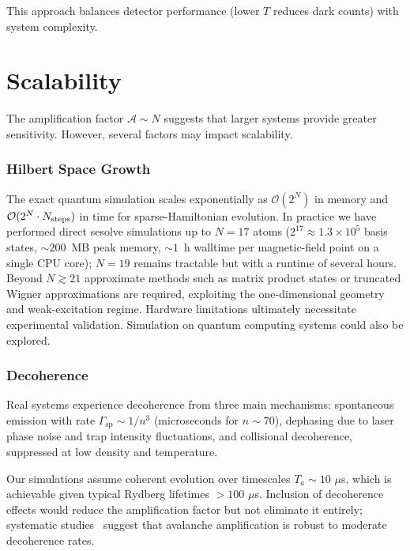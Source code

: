This approach balances detector performance (lower $T$ reduces dark counts) with system complexity.

\section{Scalability}
\label{sec:scalability_atoms}

The amplification factor $\mathcal{A} \sim N$ suggests that larger systems provide greater sensitivity. However, several factors may impact scalability.

\subsubsection{Hilbert Space Growth}

The exact quantum simulation scales exponentially as $\mathcal{O}(2^N)$ in memory and $\mathcal{O}(2^N \cdot N_{\rm steps})$ in time for sparse-Hamiltonian evolution. In practice we have performed direct sesolve simulations up to $N = 17$ atoms ($2^{17} \approx 1.3 \times 10^5$ basis states, $\sim 200$~MB peak memory, $\sim 1$~h walltime per magnetic-field point on a single CPU core); $N = 19$ remains tractable but with a runtime of several hours. Beyond $N \gtrsim 21$ approximate methods such as matrix product states or truncated Wigner approximations are required, exploiting the one-dimensional geometry and weak-excitation regime. Hardware limitations ultimately necessitate experimental validation. Simulation on quantum computing systems could also be explored.

\subsubsection{Decoherence}

Real systems experience decoherence from three main mechanisms: spontaneous emission with rate $\Gamma_{\mathrm{sp}} \sim 1/n^3$ (microseconds for $n \sim 70$), dephasing due to laser phase noise and trap intensity fluctuations, and collisional decoherence, suppressed at low density and temperature.

Our simulations assume coherent evolution over timescales $T_a \sim 10$ $\mu$s, which is achievable given typical Rydberg lifetimes $> 100$ $\mu$s. Inclusion of decoherence effects would reduce the amplification factor but not eliminate it entirely; systematic studies~\cite{Festa2022} suggest that avalanche amplification is robust to moderate decoherence rates.

